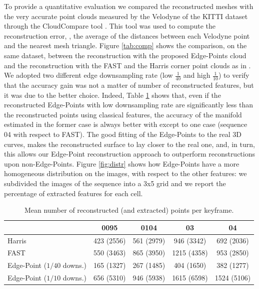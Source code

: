 To provide a quantitative evaluation we compared the reconstructed meshes with the very accurate point clouds measured by the Velodyne of the KITTI dataset through the CloudCompare tool \cite{cloudcompare}.
This tool was used to compute the reconstruction error, \ie, the average of the distances between each Velodyne point and the nearest mesh triangle.
Figure \ref{tab:comp} shows the comparison, on the same dataset, between the reconstruction with the proposed Edge-Points cloud and the reconstruction with the FAST and the Harris corner point clouds as in \cite{litvinov_Lhiuller14}.  
We adopted two different edge downsampling rate (low $\frac{1}{40}$ and high $\frac{1}{10}$) to verify that the accuracy gain was not a matter of number of reconstructed features, but it was due to the better choice. 
Indeed, Table \ref{tab:reconstrPt} shows that, even if the reconstructed Edge-Points with low downsampling rate are significantly less than the reconstructed points using classical features, the accuracy of the manifold estimated in the former case is always better with except to one case (sequence 04 with respect to FAST).  
The good fitting of the Edge-Points to the real 3D curves, makes the reconstructed surface to lay closer to the real one, and, in turn, this allows our Edge-Point reconstruction approach to outperform reconstructions upon non-Edge-Points.
Figure \ref{fig:distr} shows how Edge-Points have a more homogeneous distribution on the images, with respect to the other features: we subdivided the images of the sequence into a 3x5 grid and we report the percentage of extracted features for each cell.


\begin{table}[t]
  \caption{Mean number of reconstructed (and extracted) points per keyframe.}
    \label{tab:reconstrPt}
   \centering
   \begin{tabular}{p{}cccc}
   \toprule 
                                              & 0095            & 0104        &  03         & 04   \\
   \hline   
   {Harris}                                   & 423 (2556)      & 561 (2979)  & 946 (3342)  & 692 (2036) \\
   {FAST}                                     & 550 (3463)      & 865 (3950)  & 1215 (4358) & 953 (2850) \\
  {Edge-Point (${1}/{40}$ downs.)}   & 165 (1327)      & 267 (1485)  & 404 (1650)  & 382 (1277) \\
   {Edge-Point (${1}/{10}$ downs.)}  & 656 (5310)      & 946 (5938)  & 1615 (6598) & 1524 (5106)  \\
    \bottomrule
  \end{tabular}
  \end{table} 

